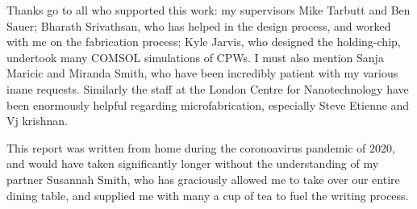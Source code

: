Thanks go to all who supported this work: my supervisors Mike Tarbutt and Ben
Sauer; Bharath Srivathsan, who has helped in the design process, and worked
with me on the fabrication process; Kyle Jarvis, who designed the holding-chip,
undertook many COMSOL simulations of CPWs.  I must also mention Sanja Maricic
and Miranda Smith, who have been incredibly patient with my various inane
requests. Similarly the staff at the London Centre for Nanotechnology have been
enormously helpful regarding microfabrication, especially Steve Etienne and Vj
krishnan.

This report was written from home during the coronoavirus pandemic of 2020, and
would have taken significantly longer without the understanding of my partner
Susannah Smith, who has graciously allowed me to take over our entire dining
table, and supplied me with many a cup of tea to fuel the writing process.

